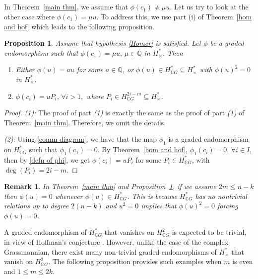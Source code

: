 \documentclass{amsart}
\newtheorem{proposition}[theorem]{Proposition}
\newtheorem{remark}[theorem]{Remark}
\newcommand{\thmref}[1]{Theorem~\ref{#1}}
\newcommand{\propref}[1]{Proposition~\ref{#1}}
\begin{document}
	
	
	\subsection{} In \thmref{main thm}, we assume that $\phi(c_1) \neq \mu u$. Let us try to look at the other case where $\phi(c_1) = \mu u$. To address this, we use part (i) of \thmref{hom and hof} which leads to the following proposition.
	
	
	\begin{proposition}\label{main thm 2}
		Assume that hypothesis \eqref{Homer} is satisfied.
		Let $\phi$ be a graded endomorphism such that $\phi(c_1)=\mu u,\, \mu \in \mathbb{Q}$ in $H^*_{\times}$. Then
		\begin{enumerate}
			\item Either $\phi(u)=a u$ for some $a \in \mathbb{Q}$, or $\phi(u) \in H^*_{\mathbb{C}G} \subseteq H^*_{\times}$ with $\phi(u)^2=0$ in $H^*_{\times}$.
			\item  $\phi(c_i) = uP_i, \, \forall i >1,$ where $P_i \in H^{2i-m}_{\mathbb CG}\subseteq H^*_\times$. 
		\end{enumerate}
	\end{proposition}
	\begin{proof} \textit{(1):} The proof of part \textit{(1)} is exactly the same as the proof of part \textit{(1)} of \thmref{main thm}. Therefore, we omit the details.
		
		\textit{(2):} Using \eqref{comm diagram}, we have that the map $\phi_1$ is a graded endomorphism on $H^*_{\mathbb{C}G}$ such that $\phi_1(c_1) =0$. By \thmref{hom and hof}, $\phi_1(c_i) =0, \, \forall i\in I$, then by \eqref{defn of phi}, we get $\phi(c_i) = uP_i$ for some $P_i \in H^*_{\mathbb{C}G}$, with $\deg(P_i) = 2i - m$. \end{proof}
	\begin{remark}
		In \thmref{main thm} and \propref{main thm 2}, if we assume $2m \leq n-k$  then $\phi(u)=0$ whenever $\phi(u) \in H^*_{\mathbb{C}G}$. This is because $H^*_{\mathbb{C}G}$ has no nontrivial relations up to degree $2(n-k)$ and $u^2=0$ implies that $\phi(u)^2=0$ forcing $\phi(u)=0$.
		
	\end{remark}
   A graded endomorphism of $H^*_{\mathbb CG}$ that vanishes on
   $H^2_{\mathbb CG}$ is expected to be trivial, in view of Hoffman’s conjecture \cite{hoffman}. However, unlike the case of the complex Grassmannian, there exist many non-trivial graded endomorphisms of $H^*_\times$ that vanish on $H^2_{\mathbb CG}$. The following proposition provides   such examples when $m$ is even and   $1\le m \le 2k$.
\end{document}
